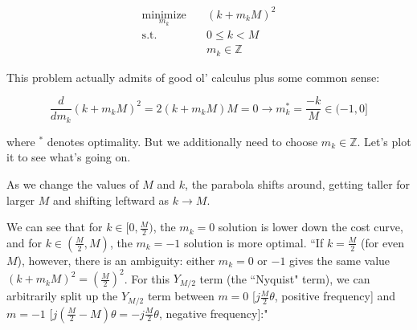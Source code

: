 \documentclass[10pt]{article}
\begin{document}
\begin{align*}
\underset{m_k}{\text{minimize}} \quad & (k + m_k M)^2 \\
\text{s.t.} \quad & 0 \leq k < M \\
	& m_k \in \mathbb{Z}
\end{align*}

This problem actually admits of good ol' calculus plus some common sense:

$$\frac{d}{dm_k} (k + m_k M)^2 = 2(k + m_k M)M = 0 \longrightarrow m_k^* = \frac{-k}{M} \in (-1, 0]$$\vspace{0mm}

where $^*$ denotes optimality. But we additionally need to choose $m_k \in \mathbb{Z}$. Let's plot it to see what's going on.

\begin{center}
\end{center}

As we change the values of $M$ and $k$, the parabola shifts around, getting taller for larger $M$ and shifting leftward as $k \rightarrow M$.

We can see that for $k \in [0, \frac{M}{2})$, the $m_k = 0$ solution is lower down the cost curve, and for $k \in (\frac{M}{2}, M)$, the $m_k = -1$ solution is more optimal. ``If $k = \frac{M}{2}$ (for even $M$), however, there is an ambiguity: either $m_k = 0$ or $-1$ gives the same value $(k + m_k M)^2 = (\frac{M}{2})^2$. For this $Y_{M/2}$ term (the ``Nyquist" term), we can arbitrarily split up the $Y_{M/2}$ term between $m = 0$ [$j\frac{M}{2}\theta$, positive frequency] and $m = -1$ [$j(\frac{M}{2} - M)\theta = -j\frac{M}{2}\theta$, negative frequency]:"
\end{document}
